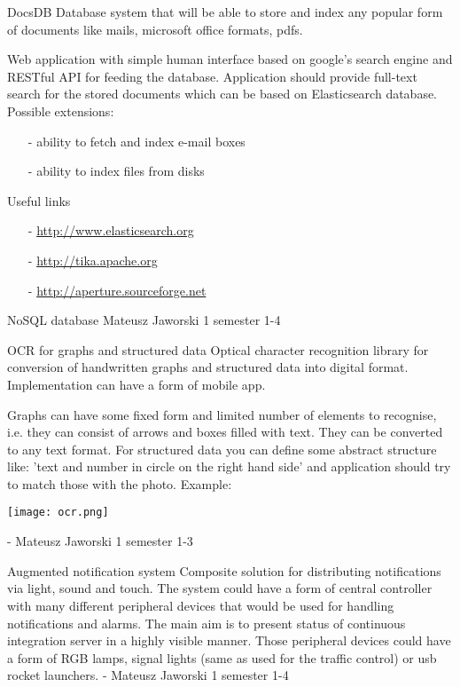 \begin{project}
{DocsDB}
{Database system that will be able to store and index any popular form of
documents like mails, microsoft office formats, pdfs.}
{
Web application with simple human interface based on google's search engine and
RESTful API for feeding the database.
Application should provide full-text search for the stored documents which can be based on Elasticsearch database.
Possible extensions:
\begin{itemize}
  \item[-] ability to fetch and index e-mail boxes
  \item[-] ability to index files from disks
\end{itemize}
Useful links
\begin{itemize}
  \item[-] \url{http://www.elasticsearch.org}
  \item[-] \url{http://tika.apache.org}
  \item[-] \url{http://aperture.sourceforge.net}
\end{itemize}
}
{NoSQL database}
{Mateusz Jaworski}
{1 semester}
{1-4}
\end{project}
\begin{project}
{OCR for graphs and structured data}
{Optical character recognition library for conversion of handwritten graphs and structured data into digital format.
Implementation can have a form of mobile app.} 
{ 
Graphs can have some fixed form and limited number of elements to recognise, i.e. 
they can consist of arrows and boxes filled with text. They can be converted to any text format.
For structured data you can define some abstract structure like: 'text and
number in circle on the right hand side' and application should try to match
those with the photo. Example:
\begin{center}\texttt{[image: ocr.png]}\end{center}
}
{-}
{Mateusz Jaworski}
{1 semester}
{1-3}
\end{project}
\begin{project}
{Augmented notification system}
{Composite solution for distributing notifications via light, sound and touch.}
{
The system could have a form of central controller with many different 
peripheral devices that would be used for handling notifications and alarms. 
The main aim is to present status of continuous integration server in a highly visible manner. 
Those peripheral devices could have a form of RGB lamps, signal lights (same as used for the traffic control) or usb rocket launchers.
}
{-}
{Mateusz Jaworski}
{1 semester}
{1-4}
\end{project}
